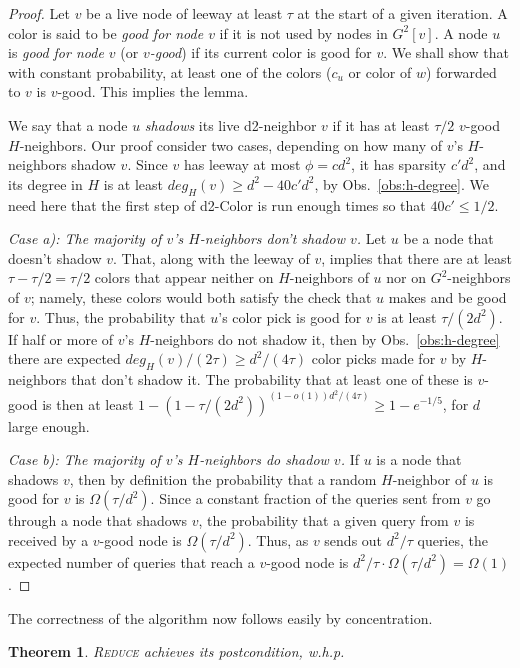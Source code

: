 \documentclass[12pt]{article}
\newtheorem{theorem}{Theorem}[section]
\newcommand{\alg}[1]{\textsc{#1}}
\begin{document}
\begin{proof}
Let $v$ be a live node of leeway at least $\tau$ at the start of a given iteration.
A color is said to be \emph{good for node $v$} if it is not used by nodes in $G^2[v]$.
A node $u$ is \emph{good for node $v$} (or \emph{$v$-good}) if its current color is good for $v$.
We shall show that with constant probability, at least one of the colors ($c_u$ or color of $w$) forwarded to $v$ is $v$-good. This implies the lemma.

We say that a node $u$ \emph{shadows} its live d2-neighbor $v$ if it has at least $\tau/2$ $v$-good $H$-neighbors.
Our proof consider two cases, depending on how many of $v$'s $H$-neighbors shadow $v$. Since $v$ has leeway at most $\phi = cd^2$, it has sparsity $c' d^2$, and its degree in $H$ is at least $deg_H(v) \ge d^2 - 40c'd^2$, by Obs.~\ref{obs:h-degree}. We need here that the first step of d2-Color is run enough times so that $40 c' \le 1/2$. 

\emph{Case a): The majority of $v$'s $H$-neighbors don't shadow $v$.}
Let $u$ be a node that doesn't shadow $v$.
That, along with the leeway of $v$, implies that there are at least $\tau - \tau/2 = \tau/2$ colors that appear neither on $H$-neighbors of $u$ nor on $G^2$-neighbors of $v$; namely, these colors would both satisfy the check that $u$ makes and be good for $v$. Thus, the probability that $u$'s color pick is good for $v$ is at least $\tau/(2d^2)$. 
If half or more of $v$'s $H$-neighbors do not shadow it, then 
by Obs.~\ref{obs:h-degree} there are expected $deg_H(v)/(2\tau) \ge d^2/(4\tau)$ color picks made for $v$ by $H$-neighbors that don't shadow it. 
The probability that at least one of these is $v$-good is
then at least $1 - (1-\tau/(2d^2))^{(1-o(1)) d^2/(4\tau)} \ge 1 - e^{-1/5}$, for $d$ large enough. 

\emph{Case b): The majority of $v$'s $H$-neighbors do shadow $v$.}
If $u$ is a node that shadows $v$, then by definition the probability that a random $H$-neighbor of $u$ is good for $v$ is $\Omega(\tau/d^2)$. 
Since a constant fraction of the queries sent from $v$ go through a node that shadows $v$, 
the probability that a given query from $v$ is received by a $v$-good node is $\Omega(\tau/d^2)$.
Thus, as $v$ sends out $d^2/\tau$ queries, the expected number of queries that reach a $v$-good node is $d^2/\tau \cdot \Omega(\tau/d^2) = \Omega(1)$. 
\end{proof}

The correctness of the algorithm now follows easily by concentration.
\begin{theorem}
\alg{Reduce} achieves its postcondition, w.h.p.
\end{theorem}
\end{document}

